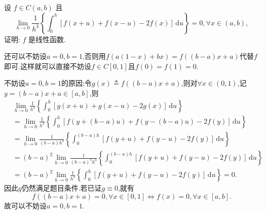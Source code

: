\documentclass[../../main.tex]{subfiles}%
\begin{document}
\begin{example}
设 $f \in C(a,b)$ 且
\[
\lim_{h \to 0} \frac{1}{h^3} \left\{ \int_0^h [f(x + u) + f(x - u) - 2f(x)] \, \mathrm{d}u \right\} = 0, \forall x \in (a,b),
\]
证明: $f$ 是线性函数.
\end{example}
\begin{note}
还可以不妨设$a=0,b=1$,否则用$f(a(1-x)+bx)=f((b-a)x+a)$代替$f$即可.这样就可以直接不妨设$f\in C[0,1]$且$f(0)=f(1)=0.$

不妨设$a=0,b=1$的原因:令$g\left( x \right) \triangleq f\left( \left( b-a \right) x+a \right) $,则对$\forall x\in \left( 0,1 \right) $,记$y=\left( b-a \right) x+a\in \left[ a,b \right] $,则
\begin{align*}
&\lim_{h\rightarrow 0} \frac{1}{h^3}\left\{ \int_0^h{[g(x+u)+g(x-u)-2g(x)]\,\mathrm{d}u} \right\} 
\\&=\lim_{h\rightarrow 0} \frac{1}{h^3}\left\{ \int_0^h{[f\left( y+\left( b-a \right) u \right) +f\left( y-\left( b-a \right) u \right) -2f\left( y \right) ]\,\mathrm{d}u} \right\} 
\\&=\lim_{h\rightarrow 0} \frac{1}{\left( b-a \right) h^3}\left\{ \int_0^{\left( b-a \right) h}{[f\left( y+u \right) +f\left( y-u \right) -2f\left( y \right) ]\,\mathrm{d}u} \right\} 
\\&=\left( b-a \right) ^2\lim_{h\rightarrow 0} \frac{1}{\left( b-a \right) ^3h^3}\left\{ \int_0^{\left( b-a \right) h}{[f\left( y+u \right) +f\left( y-u \right) -2f\left( y \right) ]\,\mathrm{d}u} \right\} 
\\&=\left( b-a \right) ^2\lim_{h\rightarrow 0} \frac{1}{h^3}\left\{ \int_0^h{[f\left( y+u \right) +f\left( y-u \right) -2f\left( y \right) ]\,\mathrm{d}u} \right\} 
=0.
\end{align*}
因此$g$仍然满足题目条件.若已证$g\equiv 0$,就有
\[
f\left( \left( b-a \right) x+a \right) =0,\forall x\in \left[ 0,1 \right] \Longleftrightarrow f\left( x \right) =0,\forall x\in \left[ a,b \right] .
\]
故可以不妨设$a=0,b=1.$
\end{note}
\end{document}
